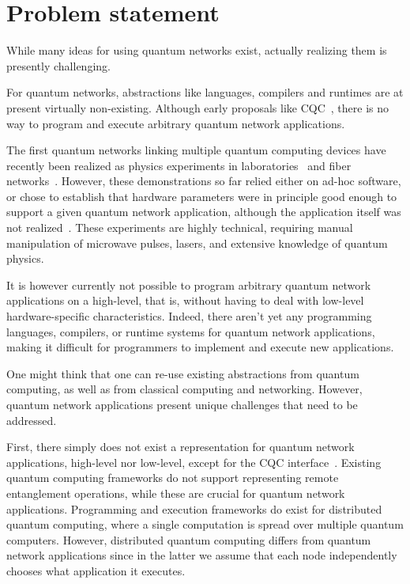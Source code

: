 \section{Problem statement}
While many ideas for using quantum networks exist, actually realizing them is presently challenging.

For quantum networks, abstractions like languages, compilers and runtimes are at present virtually non-existing.
Although early proposals like CQC~\cite{dahlberg2018simulaqron}, there is no way to program and execute arbitrary quantum network applications.

The first quantum networks linking multiple quantum computing devices have recently been realized as physics experiments in laboratories~\cite{moehring_2007_ion_traps,ritter_2012_elementary,hofmann_2012_heralded,stockill_2017_phasetuned,jing2019entanglement,stephenson_2020_highrate,pompili_2021_multinode,krutyanskiy_entanglement_2023} and fiber networks~\cite{liu2024creation,stolk2024metropolitan,knaut2024entanglement}.
However, these demonstrations so far relied either on ad-hoc software, or chose to establish that hardware parameters were in principle good enough to support a given quantum network application, although the application itself was not realized~\cite{nadlinger_device-independent_2022,liu_2022_photonic_diqkd,zhang_2022_diqkd}.
These experiments are highly technical, requiring manual manipulation of microwave pulses, lasers, and extensive knowledge of quantum physics. 

It is however currently not possible to program arbitrary quantum network applications on a high-level, that is, without having to deal with low-level hardware-specific characteristics.
Indeed, there aren't yet any programming languages, compilers, or runtime systems for quantum network applications, making it difficult for programmers to implement and execute new applications.

One might think that one can re-use existing abstractions from quantum computing, as well as from classical computing and networking.
However, quantum network applications present unique challenges that need to be addressed.

First, there simply does not exist a representation for quantum network applications, high-level nor low-level, except for the CQC interface~\cite{dahlberg2018simulaqron}.
Existing quantum computing frameworks do not support representing remote entanglement operations, while these are crucial for quantum network applications.
Programming and execution frameworks do exist for distributed quantum computing, where a single computation is spread over multiple quantum computers.
However, distributed quantum computing differs from quantum network applications since in the latter we assume that each node independently chooses what application it executes.

